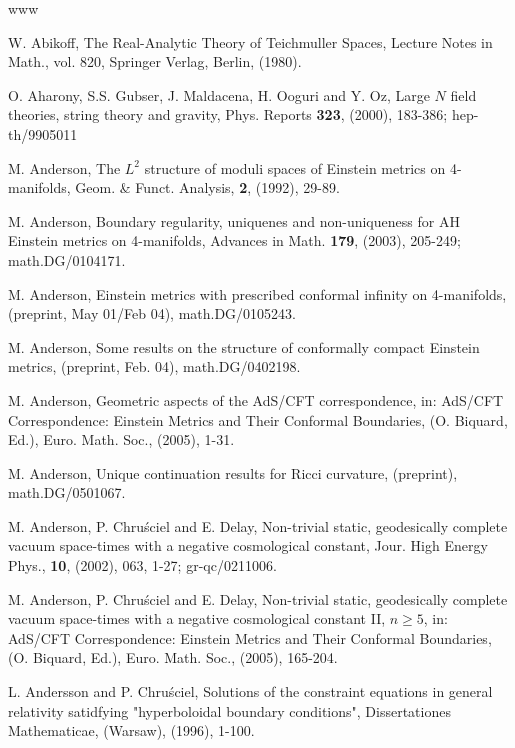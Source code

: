 \documentclass[11pt,amsfonts]{amsart}
\begin{document}

\begin{thebibliography}{www}

\footnotesize



 W. Abikoff, The Real-Analytic Theory of Teichmuller Spaces, 
Lecture Notes in Math., vol. 820, Springer Verlag, Berlin, (1980). 

 O. Aharony, S.S. Gubser, J. Maldacena, H. Ooguri and Y. Oz, 
Large $N$ field theories, string theory and gravity, Phys. Reports {\bf 323}, 
(2000), 183-386; hep-th/9905011

 M. Anderson, The $L^{2}$ structure of moduli spaces 
of Einstein metrics on 4-manifolds, Geom. \& Funct. Analysis, {\bf 2}, (1992), 
29-89. 

 M. Anderson, Boundary regularity, uniquenes and 
non-uniqueness for AH Einstein metrics on 4-manifolds, Advances in 
Math. {\bf 179}, (2003), 205-249; math.DG/0104171.

 M. Anderson, Einstein metrics with 
prescribed conformal infinity on 4-manifolds, (preprint, May 01/Feb 
04), math.DG/0105243. 

 M. Anderson, Some results on the structure 
of conformally compact Einstein metrics, (preprint, Feb. 04), 
math.DG/0402198.

 M. Anderson, Geometric aspects of the AdS/CFT 
correspondence, in: AdS/CFT Correspondence: Einstein Metrics and Their Conformal 
Boundaries, (O. Biquard, Ed.), Euro. Math. Soc., (2005), 1-31. 

 M. Anderson, Unique continuation results for Ricci curvature, 
(preprint), math.DG/0501067.

 M. Anderson, P. Chru\'sciel and E. Delay, Non-trivial static, 
geodesically complete vacuum space-times with a negative cosmological 
constant, Jour. High Energy Phys., {\bf 10}, (2002), 063, 1-27; gr-qc/0211006.

 M. Anderson, P. Chru\'sciel and E. Delay, Non-trivial 
static, geodesically complete vacuum space-times with a negative cosmological 
constant II, $n \geq  5$, in: AdS/CFT Correspondence: Einstein Metrics and Their 
Conformal Boundaries, (O. Biquard, Ed.), Euro. Math. Soc., (2005), 165-204.

 L. Andersson and P. Chru\'sciel, Solutions of the constraint 
equations in general relativity satidfying "hyperboloidal boundary conditions", 
Dissertationes Mathematicae, (Warsaw), (1996), 1-100. 


\end{thebibliography}
\end{document}
